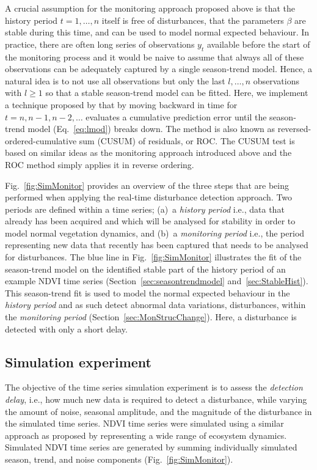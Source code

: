 \documentclass[authoryear,preprint,review,10pt]{elsarticle}
\begin{document}
A crucial assumption for the monitoring approach proposed above is that
the history period $t = 1, \dots, n$ itself is free of disturbances, that the parameters $\beta$ are stable during this time, and can be used to model normal expected behaviour. In practice, there are often long series of observations $y_t$ available
before the start of the monitoring process and it would be naive to assume
that always all of these observations can be adequately captured by a single
season-trend model. Hence, a natural idea is to not use all observations
but only the last $l, \dots, n$ observations with $l \ge 1$ so that a stable
season-trend model can be fitted. 
Here, we implement a technique proposed by \citet{Pesaran2002} that by moving backward in time for $t = n, n-1, n-2, \dots$ evaluates a cumulative prediction error until the season-trend model (Eq.~\ref{eq:lmod}) breaks down. The method is also known as reversed-ordered-cumulative sum (CUSUM) of residuals, or ROC.
The CUSUM test \citep[see][for more details]{Zeileis2002} is based on similar ideas as the monitoring approach introduced
above and the ROC method simply applies it in reverse ordering.

Fig.~\ref{fig:SimMonitor} provides an overview of the three steps that are being performed when applying the real-time disturbance detection approach. Two periods are defined within a time series; (a)~a \emph{history period} i.e., data that already has been acquired and which will be analysed for stability in order to model normal vegetation dynamics, and (b)~a \emph{monitoring period} i.e., the period representing new data that recently has been captured that needs to be analysed for disturbances. The blue line in Fig.~\ref{fig:SimMonitor} illustrates the fit of the season-trend model on the identified stable part of the history period of an example NDVI time series (Section~\ref{sec:seasontrendmodel} and~\ref{sec:StableHist}). This season-trend fit is used to model the normal expected behaviour in the \emph{history period} and as such detect abnormal data variations, disturbances, within the \emph{monitoring period}
(Section~\ref{sec:MonStrucChange}). Here, a disturbance is detected with only a short delay.

\subsection{Simulation experiment}\label{sec:Valsim}

The objective of the time series simulation experiment is to assess the \emph{detection delay}, i.e., how much new data is required to detect a disturbance,
while varying the amount of noise, seasonal amplitude, and the magnitude of the disturbance in the simulated time series. NDVI time series were simulated
using a similar approach as proposed by  \citet{Verbesselt:2010wo} representing a wide range of ecosystem dynamics. Simulated NDVI time series are generated by summing individually simulated season, trend, and noise components (Fig.~\ref{fig:SimMonitor}). 
\end{document}
